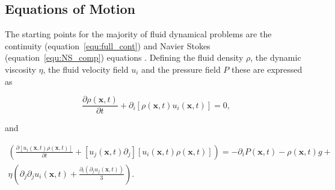 \documentclass[12pt]{article}
\begin{document}

\subsection{Equations of Motion}
\label{subsec:EoM}

The starting points for the majority of fluid dynamical problems are the continuity (equation~\ref{equ:full_cont}) and Navier Stokes (equation~\ref{equ:NS_comp}) equations \citep{Batchelor67}. Defining the fluid density $\rho$, the dynamic viscosity $\eta$, the fluid velocity field $u_{i}$ and the pressure field $P$ these are expressed as

\begin{equation}
\label{equ:full_cont}
\frac{\partial \rho(\boldsymbol x,t)}{\partial t} + \partial_{i} [\rho(\boldsymbol{x},t) u_{i} (\boldsymbol{x},t)] = 0 ,
\end{equation}  

and 

\begin{align}
\label{equ:NS_comp}
\left( \frac{\partial [u_{i}(\boldsymbol{x},t) \rho(\boldsymbol{x},t)]}{\partial t} + [u_{j}(\boldsymbol{x},t) \partial_{j}] [u_{i}(\boldsymbol{x},t) \rho(\boldsymbol{x},t)] \right) = - \partial_{i} P(\boldsymbol{x},t) - \rho(\boldsymbol{x},t) g + \nonumber \\ 
\eta \left(\partial_{j} \partial_{j} u_{i}(\boldsymbol{x},t) + \frac{\partial_{i} (\partial_{j} u_{j}(\boldsymbol{x},t))}{3} \right).
\end{align} 
\end{document}

